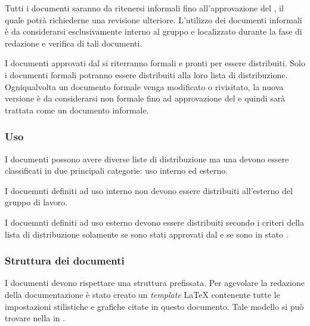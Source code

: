 \documentclass[12pt,a4paper]{article}
\begin{document}
Tutti i documenti saranno da ritenersi informali fino all'approvazione del \PM, il quale potrà richiederne una revisione ulteriore. L'utilizzo dei documenti informali è da considerarsi esclusivamente interno al gruppo e localizzato durante la fase di redazione e verifica di tali documenti.

I documenti approvati dal \PM{} si riterranno formali e pronti per essere distribuiti. Solo i documenti formali potranno essere distribuiti alla loro lista di distribuzione. Ogniqualvolta un documento formale venga modificato o rivisitato, la nuova versione è da considerarsi non formale fino ad approvazione del \PM e quindi sarà trattata come un documento informale.

\subsubsection{Uso}
I documenti possono avere diverse liste di distribuzione ma una devono essere classificati in due principali categorie: uso interno ed esterno.

I docuemnti definiti ad uso interno non devono essere distribuiti all'esterno del gruppo di lavoro.

I docuemnti definiti ad uso esterno devono essere distribuiti secondo i criteri della lista di distribuzione solamente se sono stati approvati dal \PM{} e se sono in stato .

\subsubsection{Struttura dei documenti}
I documenti devono rispettare una struttura prefissata. Per agevolare la redazione della documentazione è stato creato un \emph{template} \LaTeX{} contenente tutte le impostazioni stilistiche e grafiche citate in questo documento. Tale modello si può trovare nella  in .
\end{document}
